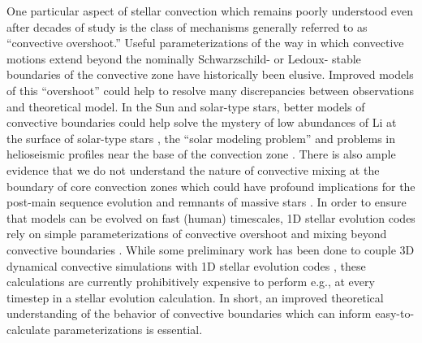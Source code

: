 \documentclass{aastex631}
\begin{document}
One particular aspect of stellar convection which remains poorly understood even after decades of study is the class of mechanisms generally referred to as ``convective overshoot.''
Useful parameterizations of the way in which convective motions extend beyond the nominally Schwarzschild- or Ledoux- stable boundaries of the convective zone have historically been elusive.
Improved models of this ``overshoot'' could help to resolve many discrepancies between observations and theoretical model.
In the Sun and solar-type stars, better models of convective boundaries could help solve the mystery of low abundances of Li at the surface of solar-type stars \citep{pinsonneault1997, dumont_etal_2021}, the ``solar modeling problem'' \citep{basu_antia_2004, bahcall_etal_2005, zhang_li_2012, vinyoles_etal_2017, asplund_etal_2021} and problems in helioseismic profiles near the base of the convection zone \citep{christensen-dalsgaard_etal_2011}.
There is also ample evidence that we do not understand the nature of convective mixing at the boundary of core convection zones \citep{claret_torres_2018, jermyn_etal_2018, viani_basu_2020, martinet_etal_2021, pedersen_etal_2021} which could have profound implications for the post-main sequence evolution and remnants of massive stars \citet{farmer_etal_2019, higgins_vink_2020}.
In order to ensure that models can be evolved on fast (human) timescales, 1D stellar evolution codes rely on simple parameterizations of convective overshoot and mixing beyond convective boundaries \citep{shaviv_salpeter_1973, maeder1975, herwig2000, paxton_etal_2011, paxton_etal_2013, paxton_etal_2018, paxton_etal_2019}.
While some preliminary work has been done to couple 3D dynamical convective simulations with 1D stellar evolution codes \citep{jorgensen_weiss_2019}, these calculations are currently prohibitively expensive to perform e.g., at every timestep in a stellar evolution calculation.
In short, an improved theoretical understanding of the behavior of convective boundaries which can inform easy-to-calculate parameterizations is essential.
\end{document}
